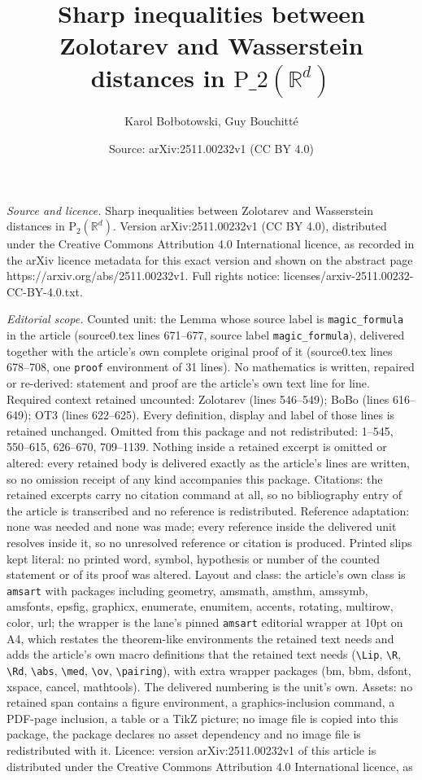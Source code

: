 \documentclass[10pt,a4paper]{amsart}
\title[Sharp inequalities between Zolotarev and Wasserstein distanc]{Sharp inequalities between Zolotarev and Wasserstein distances in $\mathrm{P}\_2(\mathbb{R}^d)$}
\author{Karol Bo{\l}botowski, Guy Bouchitt\'e}
\date{Source: arXiv:2511.00232v1 (CC BY 4.0)}
\begin{document}
\maketitle

\noindent\emph{Source and licence.} Sharp inequalities between Zolotarev and Wasserstein distances in $\mathrm{P}_2(\mathbb{R}^d)$. Version arXiv:2511.00232v1 (CC BY 4.0), distributed under the Creative Commons Attribution 4.0 International licence, as recorded in the arXiv licence metadata for this exact version and shown on the abstract page https://arxiv.org/abs/2511.00232v1. Full rights notice: licenses/arxiv-2511.00232-CC-BY-4.0.txt.\par\smallskip

\noindent\textit{Editorial scope.} Counted unit: the Lemma whose source label is \texttt{magic\_formula} in the article (source0.tex lines 671--677, source label \texttt{magic\_formula}), delivered together with the article's own complete original proof of it (source0.tex lines 678--708, one \texttt{proof} environment of 31 lines). No mathematics is written, repaired or re-derived: statement and proof are the article's own text line for line. Required context retained uncounted: Zolotarev (lines 546--549); BoBo (lines 616--649); OT3 (lines 622--625). Every definition, display and label of those lines is retained unchanged. Omitted from this package and not redistributed: 1--545, 550--615, 626--670, 709--1139. Nothing inside a retained excerpt is omitted or altered: every retained body is delivered exactly as the article's lines are written, so no omission receipt of any kind accompanies this package. Citations: the retained excerpts carry no citation command at all, so no bibliography entry of the article is transcribed and no reference is redistributed. Reference adaptation: none was needed and none was made; every reference inside the delivered unit resolves inside it, so no unresolved reference or citation is produced. Printed slips kept literal: no printed word, symbol, hypothesis or number of the counted statement or of its proof was altered. Layout and class: the article's own class is \texttt{amsart} with packages including geometry, amsmath, amsthm, amssymb, amsfonts, epsfig, graphicx, enumerate, enumitem, accents, rotating, multirow, color, url; the wrapper is the lane's pinned \texttt{amsart} editorial wrapper at 10pt on A4, which restates the theorem-like environments the retained text needs and adds the article's own macro definitions that the retained text needs (\texttt{\textbackslash Lip}, \texttt{\textbackslash R}, \texttt{\textbackslash Rd}, \texttt{\textbackslash abs}, \texttt{\textbackslash med}, \texttt{\textbackslash ov}, \texttt{\textbackslash pairing}), with extra wrapper packages (bm, bbm, dsfont, xspace, cancel, mathtools). The delivered numbering is the unit's own. Assets: no retained span contains a figure environment, a graphics-inclusion command, a PDF-page inclusion, a table or a TikZ picture; no image file is copied into this package, the package declares no asset dependency and no image file is redistributed with it. Licence: version arXiv:2511.00232v1 of this article is distributed under the Creative Commons Attribution 4.0 International licence, as 
\end{document}
